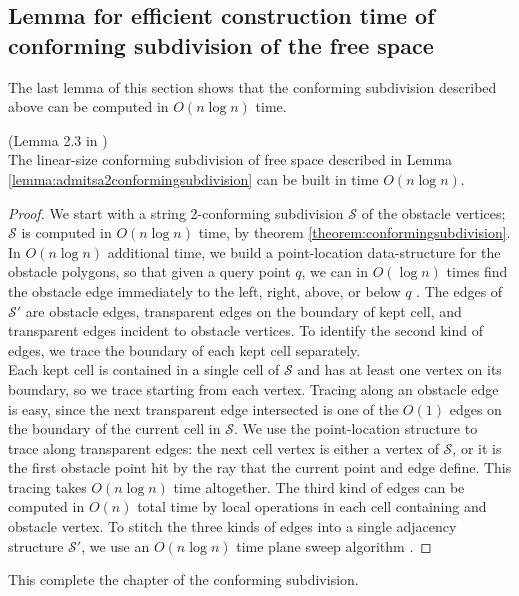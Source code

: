 \subsection{Lemma for efficient construction time of conforming subdivision of the free space}

The last lemma of this section shows that the conforming subdivision described above can be computed in $O(n\log n)$ time.

\begin{Lemma} (Lemma 2.3 in \cite{HershbergerS99})\\
The linear-size conforming subdivision of free space described in Lemma \ref{lemma:admitsa2conformingsubdivision} can be built in time $O(n\log n)$.
\end{Lemma}

\begin{proof}
We start with a string 2-conforming subdivision $\mathcal{S}$ of the obstacle vertices; $\mathcal{S}$ is computed in $O(n\log n)$ time, by theorem \ref{theorem:conformingsubdivision}. In $O(n\log n)$ additional time, we build a point-location data-structure for the obstacle polygons, so that given a query point $q$, we can in $O(\log n)$ times find the obstacle edge immediately to the left, right, above, or below $q$ \cite{EdelsbrunnerGS86}\cite{Kirkpatrick83}. The edges of $\mathcal{S}'$ are obstacle edges, transparent edges on the boundary of kept cell, and transparent edges incident to obstacle vertices. To identify the second kind of edges, we trace the boundary of each kept cell separately. \\

Each kept cell is contained in a single cell of $\mathcal{S}$ and has at least one vertex on its boundary, so we trace starting from each vertex. Tracing along an obstacle edge is easy, since the next transparent edge intersected is one of the $O(1)$ edges on the boundary of the current cell in $\mathcal{S}$. We use the point-location structure to trace along transparent edges: the next cell vertex is either a vertex of $\mathcal{S}$, or it is the first obstacle point hit by the ray that the current point and edge define. This tracing takes $O(n\log n)$ time altogether. The third kind of edges can be computed in $O(n)$ total time by local operations in each cell containing and obstacle vertex. To stitch the three kinds of edges into a single adjacency structure $\mathcal{S}'$, we use an $O(n \log n)$ time plane sweep algorithm \cite{CompGeo}.
\end{proof}

This complete the chapter of the conforming subdivision. 